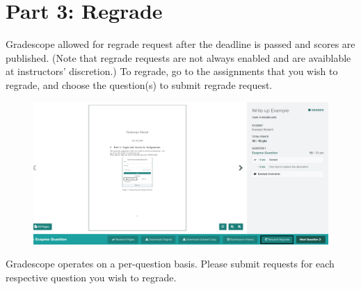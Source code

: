 \documentclass{article}
\begin{document}
\section{Part 3: Regrade}
\hspace{\parindent}Gradescope allowed for regrade request after the deadline is passed and scores are published. (Note that regrade requests are not always enabled and are avaiblable at instructors' discretion.) To regrade, go to the assignments that you wish to regrade, and choose the question(s) to submit regrade request. 
\begin{figure}[H]
\centerline{\includegraphics[scale=.5]{regrade.png}}
\label{fig}
\end{figure}
Gradescope operates on a per-question basis. Please submit requests for each respective question you wish to regrade.
\end{document}
